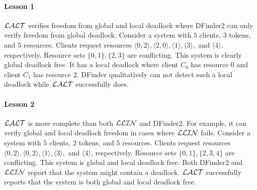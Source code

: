 \paragraph{Lesson 1} 
$\mathcal{LALT}$ verifies freedom from global and local deadlock where DFinder2 can only verify freedom from global deadlock.
Consider a system with $5$ clients, $3$ tokens, and $5$ resources.
Clients request resources $\langle 0, 2\rangle, \langle 2, 0\rangle, \langle 1 \rangle, \langle 3\rangle,$ and $\langle 4\rangle$, respectively.
Resource sets $\{ 0, 1\}, \{2,3\}$ are conflicting. 
This system is clearly global deadlock free. 
It has a local deadlock where client $C_0$ has resource $0$ and client $C_1$ has resource $2$. 
DFinder qualitatively can not detect such a local deadlock while $\mathcal{LALT}$ successfully does. 

\paragraph{Lesson 2} 
$\mathcal{LALT}$ is more complete than both $\mathcal{LLIN}$ and DFinder2. For example, it can verify global and local deadlock freedom in cases where $\mathcal{LLIN}$ fails. 
Consider a system with $5$ clients, $2$ tokens, and $5$ resources.
Clients request resources $\langle0, 2\rangle, \langle 0, 2\rangle, \langle 1 \rangle, \langle 3\rangle,$ and $\langle 4\rangle$, respectively.
Resource sets $\{ 0, 1\}, \{2,3,4\}$ are conflicting. 
This system is global and local deadlock free. 
Both DFinder2 and $\mathcal{LLIN}$ report that the system might contain a deadlock. 
$\mathcal{LALT}$ successfully reports that the system is both global and local deadlock free. 


